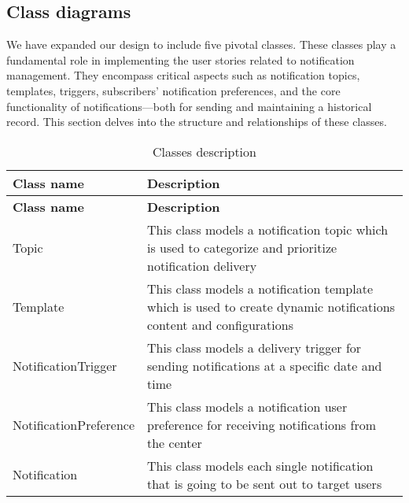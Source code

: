 \subsection{Class diagrams}
We have expanded our design to include five pivotal classes. These classes play a fundamental role in
implementing the user stories related to notification management. They encompass critical aspects such
as notification topics, templates, triggers, subscribers' notification preferences, and the core functionality of
notifications—both for sending and maintaining a historical record. This section delves into the structure
and relationships of these classes. \\

\begin{longtable}{ | m{} | m{} | }
    \caption{Classes description}                                                                                                               \\
    \hline
    \textbf{Class name}    & \textbf{Description}                                                                                               \\
    \hline
    \endfirsthead
    \hline
    \textbf{Class name}    & \textbf{Description}                                                                                               \\
    \hline
    \endhead
    \endfoot
    \hline
    \endlastfoot
    Topic                  & This class models a notification topic which is used to categorize and prioritize notification delivery            \\
    \hline
    Template               & This class models a notification template which is used to create dynamic notifications content and configurations \\
    \hline
    NotificationTrigger    & This class models a delivery trigger for sending notifications at a specific date and time                         \\
    \hline
    NotificationPreference & This class models a notification user preference for receiving notifications from the center                       \\
    \hline
    Notification           & This class models each single notification that is going to be sent out to target users                            \\
    \hline
\end{longtable}


